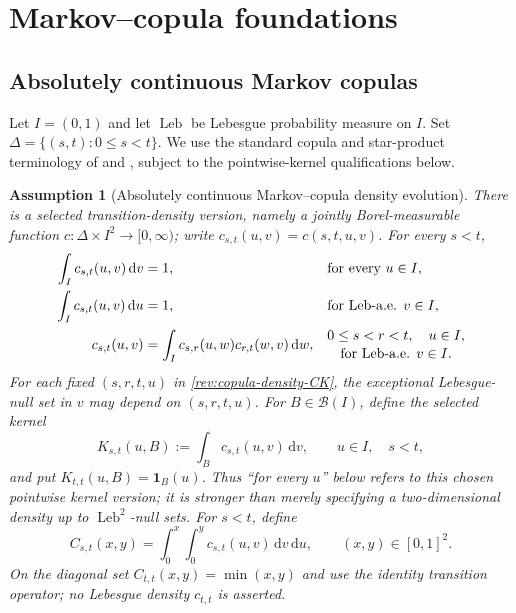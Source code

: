\documentclass[11pt]{article}
\newtheorem{assumption}[definition]{Assumption}
\theoremstyle{remark}
\newcommand{\dd}{\,\mathrm d}
\newcommand{\one}{\mathbf 1}
\newcommand{\Leb}{\operatorname{Leb}}
\begin{document}
\section{Markov--copula foundations}

\subsection{Absolutely continuous Markov copulas}

Let $I=(0,1)$ and let $\Leb$ be Lebesgue probability measure on $I$.
Set $\Delta=\{(s,t):0\le s<t\}$.
We use the standard copula and star-product terminology of
\citet{Nelsen2006} and \citet{DarsowNguyenOlsen1992}, subject to the
pointwise-kernel qualifications below.

\begin{assumption}[Absolutely continuous Markov--copula density evolution]
\label{rev:ass-copula-density}
There is a \emph{selected transition-density version}, namely a jointly
Borel-measurable function
$c:\Delta\times I^2\to[0,\infty)$; write
$c_{s,t}(u,v)=c(s,t,u,v)$.  For every $s<t$,
\begin{align}
\int_I c_{s,t}(u,v)\dd v&=1,
&&\text{for every }u\in I,\notag\\
\int_I c_{s,t}(u,v)\dd u&=1,
&&\text{for $\Leb$-a.e. }v\in I,
\label{rev:copula-density-margins}\\
c_{s,t}(u,v)&=\int_Ic_{s,r}(u,w)c_{r,t}(w,v)\dd w,
&&\begin{gathered}
0\le s<r<t,\quad u\in I,\\[-2pt]
\text{for $\Leb$-a.e. }v\in I.
\end{gathered}
\label{rev:copula-density-CK}
\end{align}
For each fixed $(s,r,t,u)$ in \eqref{rev:copula-density-CK}, the exceptional
Lebesgue-null set in $v$ may depend on $(s,r,t,u)$.  For $B\in\mathcal B(I)$,
define the selected kernel
\begin{equation}
K_{s,t}(u,B):=\int_Bc_{s,t}(u,v)\dd v,
\qquad u\in I,\quad s<t,
\label{rev:selected-copula-kernel}
\end{equation}
and put $K_{t,t}(u,B)=\one_B(u)$.  Thus ``for every $u$'' below refers to this
chosen pointwise kernel version; it is stronger than merely specifying a
two-dimensional density up to $\Leb^2$-null sets.
For $s<t$, define
\begin{equation}
C_{s,t}(x,y)=\int_0^x\int_0^y c_{s,t}(u,v)\dd v\dd u,
\qquad (x,y)\in[0,1]^2.
\label{rev:copula-from-density}
\end{equation}
On the diagonal set $C_{t,t}(x,y)=\min(x,y)$ and use the identity transition
operator; no Lebesgue density $c_{t,t}$ is asserted.
\end{assumption}
\end{document}
